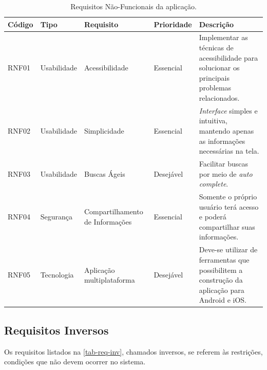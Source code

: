 \begin{table}[htb]
    \begin{center}
        \ABNTEXfontereduzida
        \caption{Requisitos Não-Funcionais da aplicação.}
        \label{tab-req-nf}
        \begin{tabular}{p{1.1cm}|p{1.6cm}|p{3.0cm}|p{1.5cm}|p{6.7cm}}
            \textbf{Código} & \textbf{Tipo} & \textbf{Requisito}              & \textbf{Prioridade} & \textbf{Descrição} \\
            \hline
            RNF01           & Usabilidade   & Acessibilidade                  & Essencial           &
            Implementar as técnicas de acessibilidade para solucionar os principais problemas relacionados.              \\
            \hline
            RNF02           & Usabilidade   & Simplicidade                    & Essencial           &
            \emph{Interface} simples e intuitiva, mantendo apenas as informações necessárias na tela.                    \\
            \hline
            RNF03           & Usabilidade   & Buscas Ágeis                    & Desejável           &
            Facilitar buscas por meio de \emph{auto complete}.                                                           \\
            \hline
            RNF04           & Segurança     & Compartilhamento de Informações & Essencial           &
            Somente o próprio usuário terá acesso e poderá compartilhar suas informações.                                \\
            \hline
            RNF05           & Tecnologia    & Aplicação multiplataforma       & Desejável           &
            Deve-se utilizar de ferramentas que possibilitem a construção da aplicação para Android e iOS\@.             \\
        \end{tabular}
    \end{center}
\end{table}

\subsection{Requisitos Inversos}

Os requisitos listados na \autoref{tab-req-inv}, chamados inversos, se referem às restrições, condições que não devem ocorrer no sistema.

